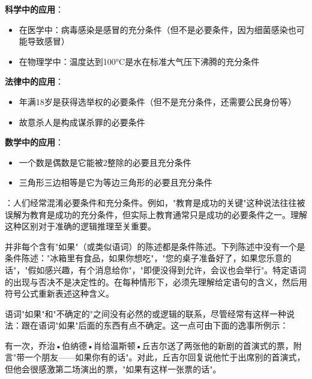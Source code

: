\begin{examplebox}[title=必要条件与充分条件的实际应用]
\textbf{科学中的应用}：
\begin{itemize}
\item 在医学中：病毒感染是感冒的充分条件（但不是必要条件，因为细菌感染也可能导致感冒）
\item 在物理学中：温度达到100°C是水在标准大气压下沸腾的充分条件
\end{itemize}

\textbf{法律中的应用}：
\begin{itemize}
\item 年满18岁是获得选举权的必要条件（但不是充分条件，还需要公民身份等）
\item 故意杀人是构成谋杀罪的必要条件
\end{itemize}

\textbf{数学中的应用}：
\begin{itemize}
\item 一个数是偶数是它能被2整除的必要且充分条件
\item 三角形三边相等是它为等边三角形的必要且充分条件
\end{itemize}
\end{examplebox}

：人们经常混淆必要条件和充分条件。例如，"教育是成功的关键"这种说法往往被误解为教育是成功的充分条件，但实际上教育通常只是成功的必要条件之一。理解这种区别对于准确的逻辑推理至关重要。

并非每个含有"如果"（或类似语词）的陈述都是条件陈述。下列陈述中没有一个是条件陈述："冰箱里有食品，如果你想吃"，"您的桌子准备好了，如果您乐意的话"，"假如感兴趣，有个消息给你"，"即便没得到允许，会议也会举行"。特定语词的出现与否决不是决定性的。在每种情形下，必须先理解给定语句的含义，然后用符号公式重新表述这种含义。

语词"如果"和"不确定的"之间没有必然的或逻辑的联系，尽管经常有这样一种说法：跟在语词"如果"后面的东西有点不确定。这一点可由下面的逸事所例示：

有一次，乔治•伯纳德•肖给温斯顿•丘吉尔送了两张他的新剧的首演式的票，附言"带一个朋友——如果你有的话"。对此，丘吉尔回复说他忙于出席别的首演式，但他会很感激第二场演出的票，"如果有这样一张票的话"\cite{churchill1953}。

